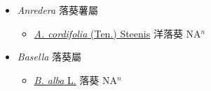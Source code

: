 
  \begin{itemize}
 \item[] \textit{Anredera} 落葵薯屬
                    
  \begin{itemize}
        \item[] \href{http://www.theplantlist.org/tpl1.1/search?q=Anredera+cordifolia}{\textit{A. cordifolia} (Ten.) Steenis}   洋落葵 NA$^n$
  \end{itemize}
 \item[] \textit{Basella} 落葵屬
                    
  \begin{itemize}
        \item[] \href{http://www.theplantlist.org/tpl1.1/search?q=Basella+alba}{\textit{B. alba} L.}   落葵 NA$^n$
  \end{itemize}
  \end{itemize}
